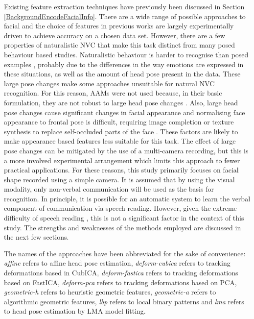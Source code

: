 Existing feature extraction techniques have previously been discussed in Section \ref{BackgroundEncodeFacialInfo}. There are a wide range of possible approaches to facial \featureGeneration and the choice of features in previous works are largely experimentally driven to achieve accuracy on a chosen data set. However, there are a few properties of naturalistic \ac{NVC} that make this task distinct from many posed behaviour based studies. Naturalistic behaviour is harder to recognise than posed examples \cite{Cohn2004b}, probably due to the differences in the way emotions are expressed in these situations, as well as the amount of head pose present in the data. These large pose changes make some approaches unsuitable for natural \ac{NVC} recognition. For this reason, \ac{AAM}s were not used because, in their basic formulation, they are not robust to large head pose changes \cite{Sung2008}. Also, large head pose changes cause significant changes in facial appearance \cite{Lu2006} and normalising face appearance to frontal pose is difficult, requiring image completion or texture synthesis to replace self-occluded parts of the face \cite{Asthana2011}. These factors are likely to make appearance based features less suitable for this task. The effect of large pose changes can be mitigated by the use of a multi-camera recording, but this is a more involved experimental arrangement which limits this approach to fewer practical applications. For these reasons, this study primarily focuses on facial shape recorded using a simple camera. It is assumed that by using the visual modality, only non-verbal communication will be used as the basis for recognition. In principle, it is possible for an automatic system to learn the verbal component of communication via speech reading. However, given the extreme difficulty of speech reading \cite{Ong2011}, this is not a significant factor in the context of this study. The strengths and weaknesses of the methods employed are discussed in the next few sections.

The names of the \featureGeneration approaches have been abbreviated for the sake of convenience: \textit{affine} refers to affine head pose estimation, \textit{deform-cubica} refers to tracking deformations based in CubICA, \textit{deform-fastica} refers to tracking deformations based on FastICA, \textit{deform-pca} refers to tracking deformations based on PCA, \textit{geometric-h} refers to heuristic geometric features, \textit{geometric-a} refers to algorithmic geometric features, \textit{lbp} refers to local binary patterns and \textit{lma} refers to head pose estimation by \acf{LMA} model fitting.

